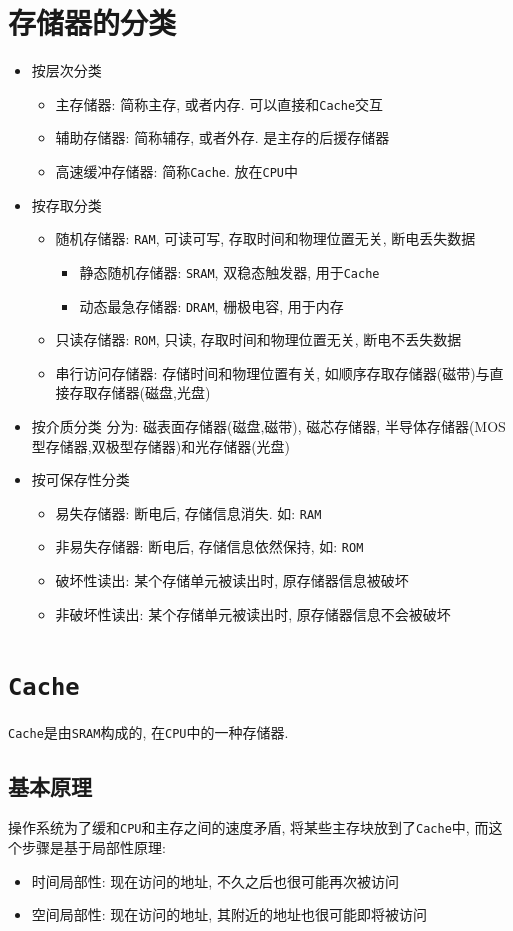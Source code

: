 \section{存储器的分类}
\begin{itemize}
\item 按层次分类
\begin{itemize}
\item 主存储器: 简称主存, 或者内存. 可以直接和\verb|Cache|交互
\item 辅助存储器: 简称辅存, 或者外存. 是主存的后援存储器
\item 高速缓冲存储器: 简称\verb|Cache|. 放在\verb|CPU|中
\end{itemize}
\item 按存取分类
\begin{itemize}
\item 随机存储器: \verb|RAM|, 可读可写, 存取时间和物理位置无关, 断电丢失数据
\begin{itemize}
\item 静态随机存储器: \verb|SRAM|, 双稳态触发器, 用于\verb|Cache|
\item 动态最急存储器: \verb|DRAM|, 栅极电容, 用于内存
\end{itemize}
\item 只读存储器: \verb|ROM|, 只读, 存取时间和物理位置无关, 断电不丢失数据
\item 串行访问存储器: 存储时间和物理位置有关, 如顺序存取存储器(磁带)与直接存取存储器(磁盘,光盘)
\end{itemize}
\item 按介质分类
分为: 磁表面存储器(磁盘,磁带), 磁芯存储器, 半导体存储器(MOS型存储器,双极型存储器)和光存储器(光盘)
\item 按可保存性分类
\begin{itemize}
\item 易失存储器: 断电后, 存储信息消失. 如: \verb|RAM|
\item 非易失存储器: 断电后, 存储信息依然保持, 如: \verb|ROM|
\item 破坏性读出: 某个存储单元被读出时, 原存储器信息被破坏
\item 非破坏性读出: 某个存储单元被读出时, 原存储器信息不会被破坏
\end{itemize}
\end{itemize}
\section{\texttt{Cache}}
\verb|Cache|是由\verb|SRAM|构成的, 在\verb|CPU|中的一种存储器.
\subsection{基本原理}
操作系统为了缓和\verb|CPU|和主存之间的速度矛盾, 将某些主存块放到了\verb|Cache|中, 而这个步骤是基于局部性原理:
\begin{itemize}
\item 时间局部性: 现在访问的地址, 不久之后也很可能再次被访问
\item 空间局部性: 现在访问的地址, 其附近的地址也很可能即将被访问
\end{itemize}
